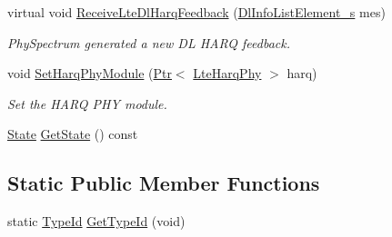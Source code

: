\begin{DoxyCompactItemize}
virtual void \hyperlink{classns3_1_1LteUePhy_a46e7ead3dd806585ba62afdda8b90bb2}{Receive\+Lte\+Dl\+Harq\+Feedback} (\hyperlink{structns3_1_1DlInfoListElement__s}{Dl\+Info\+List\+Element\+\_\+s} mes)
\begin{DoxyCompactList}\small\item\em Phy\+Spectrum generated a new DL H\+A\+RQ feedback. \end{DoxyCompactList}\item 
void \hyperlink{classns3_1_1LteUePhy_a15fc43f221724f502ac9f824a1f4fdbb}{Set\+Harq\+Phy\+Module} (\hyperlink{classns3_1_1Ptr}{Ptr}$<$ \hyperlink{classns3_1_1LteHarqPhy}{Lte\+Harq\+Phy} $>$ harq)
\begin{DoxyCompactList}\small\item\em Set the H\+A\+RQ P\+HY module. \end{DoxyCompactList}\item 
\hyperlink{classns3_1_1LteUePhy_ae5118801f100c494663f0ca1e942aa31}{State} \hyperlink{classns3_1_1LteUePhy_ad426638f650cfe7cef152be29661c408}{Get\+State} () const 
\end{DoxyCompactItemize}
\subsection*{Static Public Member Functions}
\begin{DoxyCompactItemize}
\item 
static \hyperlink{classns3_1_1TypeId}{Type\+Id} \hyperlink{classns3_1_1LteUePhy_a6934c332600719042027da84e70e82a1}{Get\+Type\+Id} (void)
\end{DoxyCompactItemize}
